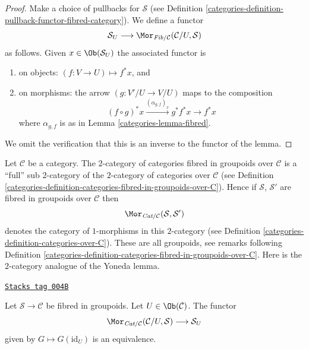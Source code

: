 \begin{proof}

Make a choice of pullbacks for $\mathcal{S}$
(see Definition \ref{categories-definition-pullback-functor-fibred-category}).
We define a functor
$$
\mathcal{S}_U
\longrightarrow
\Mor_{\textit{Fib}/\mathcal{C}}(\mathcal{C}/U, \mathcal{S})
$$
as follows. Given
$x \in \Ob(\mathcal{S}_U)$
the associated functor is
\begin{enumerate}
\item on objects: $(f : V \to U) \mapsto f^*x$, and
\item on morphisms: the arrow $(g : V'/U \to V/U)$ maps to
the composition
$$
(f \circ g)^*x \xrightarrow{(\alpha_{g, f})_x} g^*f^*x \rightarrow f^*x
$$
where $\alpha_{g, f}$ is as in Lemma \ref{categories-lemma-fibred}.
\end{enumerate}
We omit the verification that this is an inverse to the functor
of the lemma.
\end{proof}

Let $\mathcal{C}$ be a category. The $2$-category of categories
fibred in groupoids over $\mathcal{C}$ is a
``full'' sub $2$-category of the $2$-category of categories over
$\mathcal{C}$ (see
Definition \ref{categories-definition-categories-fibred-in-groupoids-over-C}).
Hence if $\mathcal{S}$, $\mathcal{S}'$ are fibred in groupoids
over $\mathcal{C}$ then
$$
\Mor_{\textit{Cat}/\mathcal{C}}(\mathcal{S}, \mathcal{S}')
$$
denotes the category of $1$-morphisms in this $2$-category
(see Definition \ref{categories-definition-categories-over-C}).
These are all groupoids, see remarks following
Definition \ref{categories-definition-categories-fibred-in-groupoids-over-C}.
Here is the $2$-category analogue of the Yoneda lemma.

\begin{lemma}

\label{categories-lemma-yoneda-2category}
\href{https://stacks.math.columbia.edu/tag/004B}{\texttt{Stacks tag 004B}}

Let $\mathcal{S}\to \mathcal{C}$ be fibred in groupoids.
Let $U \in \Ob(\mathcal{C})$.
The functor
$$
\Mor_{\textit{Cat}/\mathcal{C}}(\mathcal{C}/U, \mathcal{S})
\longrightarrow
\mathcal{S}_U
$$
given by $G \mapsto G(\text{id}_U)$ is an equivalence.
\end{lemma}


